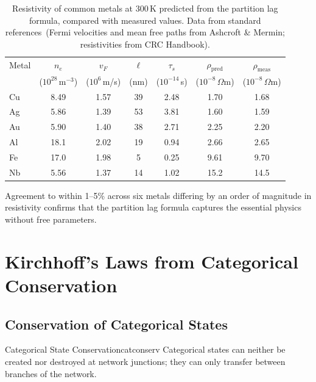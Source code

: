 \begin{table}[htbp]
  \centering
  \caption{Resistivity of common metals at 300\,K predicted from the
    partition lag formula, compared with measured values.
    Data from standard references~(Fermi velocities and mean free paths
    from Ashcroft \& Mermin; resistivities from CRC Handbook).}
  \label{tab:ch18-resistivity}
  \begin{tabular}{lcccccc}
    \toprule
    Metal & $n_e$ & $v_F$ & $\ell$ & $\tau_s$ &
      $\rho_{\mathrm{pred}}$ & $\rho_{\mathrm{meas}}$ \\
    & ($10^{28}$\,m$^{-3}$) & ($10^6$\,m/s) & (nm) &
      ($10^{-14}$\,s) &
      ($10^{-8}$\,$\Omega$m) & ($10^{-8}$\,$\Omega$m) \\
    \midrule
    Cu & 8.49 & 1.57 & 39 & 2.48 & 1.70 & 1.68 \\
    Ag & 5.86 & 1.39 & 53 & 3.81 & 1.60 & 1.59 \\
    Au & 5.90 & 1.40 & 38 & 2.71 & 2.25 & 2.20 \\
    Al & 18.1 & 2.02 & 19 & 0.94 & 2.66 & 2.65 \\
    Fe & 17.0 & 1.98 &  5 & 0.25 & 9.61 & 9.70 \\
    Nb & 5.56 & 1.37 & 14 & 1.02 &15.2  &14.5  \\
    \bottomrule
  \end{tabular}
\end{table}

Agreement to within 1--5\% across six metals differing by an order of
magnitude in resistivity confirms that the partition lag formula captures
the essential physics without free parameters.

\section{Kirchhoff's Laws from Categorical Conservation}
\label{sec:ch18-kirchhoff}

\subsection{Conservation of Categorical States}

\begin{axiom}{Categorical State Conservation}{catconserv}
  Categorical states can neither be created nor destroyed at network
  junctions; they can only transfer between branches of the network.
\end{axiom}

